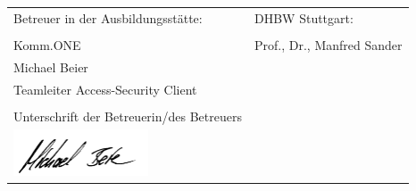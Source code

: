 \begin{spacing}{1}
	\vfill

	\begin{tabular}{ll}
		Betreuer in der Ausbildungsstätte: & DHBW Stuttgart:            \\
		\hspace{0.4\linewidth}             &                            \\
		Komm.ONE                           & Prof., Dr., Manfred Sander \\
		Michael Beier                                                   \\
		Teamleiter Access-Security Client                               \\
		\\
		Unterschrift der Betreuerin/des Betreuers                       \\
		\includegraphics[width=4cm]{graphics/signatur.png}
	\end{tabular}

	\vspace{1cm}
\end{spacing}



